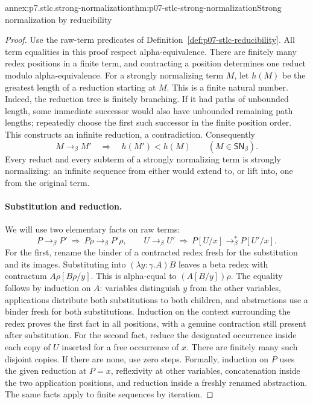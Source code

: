 \begin{annexitem}{annex:p7.stlc.strong-normalization}{thm:p07-stlc-strong-normalization}{Strong normalization by reducibility}
\begin{proof}
Use the raw-term predicates of Definition~\ref{def:p07-stlc-reducibility}.
All term equalities in this proof respect alpha-equivalence. There are
finitely many redex positions in a finite term, and contracting a position
determines one reduct modulo alpha-equivalence. For a strongly normalizing
term \(M\), let \(h(M)\) be the greatest length of a reduction starting
at \(M\). This is a finite natural number. Indeed, the reduction tree is
finitely branching. If it had paths of unbounded length, some immediate
successor would also have unbounded remaining path lengths; repeatedly choose
the first such successor in the finite position order. This constructs an
infinite reduction, a contradiction. Consequently
\[
 M\to_\beta M'\quad\Longrightarrow\quad h(M')<h(M)
 \qquad(M\in\mathsf{SN}_\beta).
\]
Every reduct and every subterm of a strongly normalizing term is strongly
normalizing: an infinite sequence from either would extend to, or lift into,
one from the original term.

\paragraph{Substitution and reduction.}
We will use two elementary facts on raw terms:
\[
 P\to_\beta P'\ \Longrightarrow\ P\rho\to_\beta P'\rho,
 \qquad
 U\to_\beta U'\ \Longrightarrow\ P[U/x]\to_\beta^*P[U'/x].
 \tag{S}
\]
For the first, rename the binder of a contracted redex fresh for the
substitution and its images. Substituting into
\((\lambda y{:}\gamma.A)B\) leaves a beta redex with contractum
\(A\rho[B\rho/y]\). This is alpha-equal to \((A[B/y])\rho\).
The equality follows by induction on \(A\): variables distinguish \(y\)
from the other variables, applications distribute both substitutions to
both children, and abstractions use a binder fresh for both substitutions.
Induction on the context surrounding the redex proves the first fact in
all positions, with a genuine contraction still present after substitution.
For the second fact, reduce the designated occurrence inside each copy of
\(U\) inserted for a free occurrence of \(x\). There are finitely many
such disjoint copies. If there are none, use zero steps. Formally, induction
on \(P\) uses the given reduction at \(P=x\), reflexivity at other
variables, concatenation inside the two application positions, and reduction
inside a freshly renamed abstraction. The same facts apply to finite
sequences by iteration.


\end{proof}
\end{annexitem}
